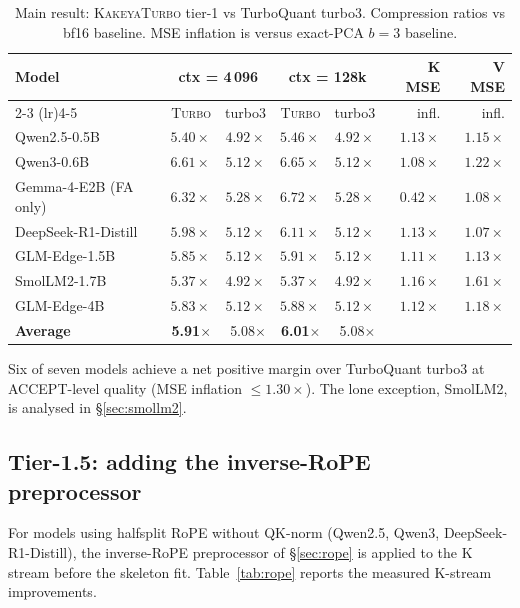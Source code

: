 \documentclass[11pt,a4paper]{article}
\theoremstyle{definition}
\theoremstyle{plain}
\begin{document}
\begin{table}[H]
\centering
\small
\caption{Main result: \textsc{KakeyaTurbo} tier-1 vs TurboQuant turbo3. Compression ratios vs bf16 baseline. MSE inflation is versus exact-PCA $b=3$ baseline.}
\label{tab:main}
\begin{tabular}{lrrrrrr}
  \toprule
  Model & \multicolumn{2}{c}{ctx = 4\,096} & \multicolumn{2}{c}{ctx = 128k} & K MSE & V MSE \\
  \cmidrule(lr){2-3} \cmidrule(lr){4-5}
  & \textsc{Turbo} & turbo3 & \textsc{Turbo} & turbo3 & infl. & infl. \\
  \midrule
  Qwen2.5-0.5B          & $5.40\times$ & $4.92\times$ & $5.46\times$ & $4.92\times$ & $1.13\times$ & $1.15\times$ \\
  Qwen3-0.6B            & $\mathbf{6.61\times}$ & $5.12\times$ & $\mathbf{6.65\times}$ & $5.12\times$ & $1.08\times$ & $1.22\times$ \\
  Gemma-4-E2B (FA only) & $\mathbf{6.32\times}$ & $5.28\times$ & $\mathbf{6.72\times}$ & $5.28\times$ & $0.42\times$ & $1.08\times$ \\
  DeepSeek-R1-Distill   & $5.98\times$ & $5.12\times$ & $6.11\times$ & $5.12\times$ & $1.13\times$ & $1.07\times$ \\
  GLM-Edge-1.5B         & $5.85\times$ & $5.12\times$ & $5.91\times$ & $5.12\times$ & $1.11\times$ & $1.13\times$ \\
  SmolLM2-1.7B          & $5.37\times$ & $4.92\times$ & $5.37\times$ & $4.92\times$ & $1.16\times$ & $1.61\times$ \\
  GLM-Edge-4B           & $5.83\times$ & $5.12\times$ & $5.88\times$ & $5.12\times$ & $1.12\times$ & $1.18\times$ \\
  \midrule
  \textbf{Average}      & \textbf{5.91}$\times$ & 5.08$\times$ & \textbf{6.01}$\times$ & 5.08$\times$ & & \\
  \bottomrule
\end{tabular}
\end{table}

Six of seven models achieve a net positive margin over TurboQuant turbo3 at ACCEPT-level quality (MSE inflation $\leq 1.30\times$). The lone exception, SmolLM2, is analysed in \S\ref{sec:smollm2}.

\subsection{Tier-1.5: adding the inverse-RoPE preprocessor}

For models using halfsplit RoPE without QK-norm (Qwen2.5, Qwen3, DeepSeek-R1-Distill), the inverse-RoPE preprocessor of \S\ref{sec:rope} is applied to the K stream before the skeleton fit. Table~\ref{tab:rope} reports the measured K-stream improvements.
\end{document}
